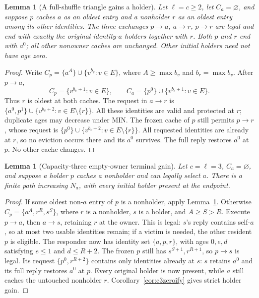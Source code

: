 \documentclass[11pt]{article}
\newtheorem{lemma}[theorem]{Lemma}
\begin{document}
\begin{lemma}[A full-shuffle triangle gains a holder]
\label{lem:fullshuffletrianglegain}
Let $\ell=c\ge2$, let $C_a=\varnothing$, and suppose $p$
caches $a$ as an oldest entry and a nonholder $r$ as an
oldest entry among its other identities. The three exchanges
$p\to a$, $a\to r$, $p\to r$ are legal and end with
exactly the original identity-$a$ holders together with $r$.
Both $p$ and $r$ end with $a^0$; all other nonowner caches
are unchanged. Other initial holders need not have age zero.
\end{lemma}
\begin{proof}
Write $C_p=\{a^A\}\cup\{v^{b_v}:v\in E\}$, where
$A\ge\max b_v$ and $b_r=\max b_v$. After $p\to a$,
\[
 C_p=\{v^{b_v+1}:v\in E\},\qquad
 C_a=\{p^0\}\cup\{v^{b_v+1}:v\in E\}.
\]
Thus $r$ is oldest at both caches. The request in $a\to r$
is $\{a^0,p^1\}\cup\{v^{b_v+2}:v\in E\setminus\{r\}\}$.
All these identities are valid and protected at $r$; duplicate
ages may decrease under MIN. The frozen cache of $p$ still
permits $p\to r$, whose request is
$\{p^0\}\cup\{v^{b_v+2}:v\in E\setminus\{r\}\}$.
All requested identities are already at $r$, so no eviction
occurs there and its $a^0$ survives. The full reply restores
$a^0$ at $p$. No other cache changes.
\end{proof}

\begin{lemma}[Capacity-three empty-owner terminal gain]
\label{lem:c3ownerterminalgain}
Let $c=\ell=3$, $C_a=\varnothing$, and suppose a holder $p$
caches a nonholder and can legally select $a$. There is a
finite path increasing $N_a$, with every initial holder
present at the endpoint.
\end{lemma}
\begin{proof}
If some oldest non-$a$ entry of $p$ is a nonholder, apply
Lemma~\ref{lem:fullshuffletrianglegain}. Otherwise
$C_p=\{a^A,r^R,s^S\}$, where $r$ is a nonholder, $s$ is
a holder, and $A\ge S>R$. Execute $p\to a$, then $a\to s$,
retaining $r$ at the owner. This is legal: $s$'s reply
contains self-$a$, so at most two usable identities remain;
if a victim is needed, the other resident $p$ is eligible.
The responder now has identity set $\{a,p,r\}$, with ages
$0,e,d$ satisfying $e\le1$ and $d\le R+2$.
The frozen $p$ still has $s^{S+1},r^{R+1}$, so $p\to s$
is legal. Its request $\{p^0,r^{R+2}\}$ contains only
identities already at $s$: $s$ retains $a^0$ and its full
reply restores $a^0$ at $p$. Every original holder is now
present, while $a$ still caches the untouched nonholder $r$.
Corollary~\ref{cor:c3zeroify} gives strict holder gain.
\end{proof}
\end{document}
